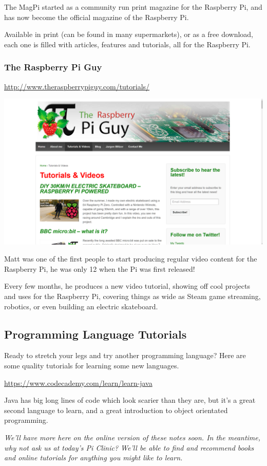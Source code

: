 			The MagPi started as a community run print magazine for the Raspberry Pi, and has now become the official magazine of the Raspberry Pi.
			
			Available in print (can be found in many supermarkets), or as a free download, each one is filled with articles, features and tutorials, all for the Raspberry Pi.
			
		\subsubsection*{The Raspberry Pi Guy}
			
			\url{http://www.theraspberrypiguy.com/tutorials/}
			\begin{center}
				\includegraphics[width=0.5\linewidth]{sections/2_Resources/piguy}
			\end{center}	
			
			Matt was one of the first people to start producing regular video content for the Raspberry Pi, he was only 12 when the Pi was first released!
			
			Every few months, he produces a new video tutorial, showing off cool projects and uses for the Raspberry Pi, covering things as wide as Steam game streaming, robotics, or even building an electric skateboard.
		
	\subsection{Programming Language Tutorials}
	
		Ready to stretch your legs and try another programming language? Here are some quality tutorials for learning some new languages.
		
		\url{https://www.codecademy.com/learn/learn-java}
		
		Java has big long lines of code which look scarier than they are, but it's a great second language to learn, and a great introduction to object orientated programming.
		
		\textit{We'll have more here on the online version of these notes soon. In the meantime, why not ask us at today's Pi Clinic? We'll be able to find and recommend books and online tutorials for anything you might like to learn.}
	

